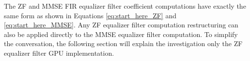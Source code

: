 %

The ZF and MMSE FIR equalizer filter coefficient computations have exactly the same form as shown in Equations \eqref{eq:start_here_ZF} and \eqref{eq:start_here_MMSE}.
Any ZF equalizer filter computation restructuring can also be applied directly to the MMSE equalizer filter computation.
To simplify the conversation, the following section will explain the investigation only the ZF equalizer filter GPU implementation.

